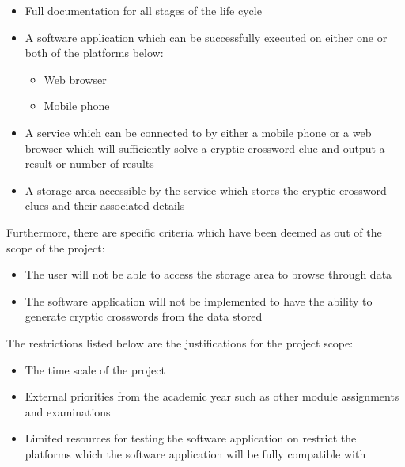 \begin{itemize}
	\item Full documentation for all stages of the life cycle
	\item A software application which can be successfully executed on either one
	      or both of the platforms below:
		\begin{itemize}
			\item Web browser
			\item Mobile phone
		\end{itemize}
	\item A service which can be connected to by either a mobile phone or a web 
	      browser which will sufficiently solve a cryptic crossword clue and 
	      output a result or number of results 
	\item A storage area accessible by the service which stores the cryptic 
	      crossword clues and their associated details
\end{itemize}

Furthermore, there are specific criteria which have been deemed as out of the 
scope of the project:

\begin{itemize}
	\item The user will not be able to access the storage area to browse through 
	      data
	\item The software application will not be implemented to have the ability to
	      generate cryptic crosswords from the data stored
\end{itemize}

The restrictions listed below are the justifications for the project scope:

\begin{itemize}
	\item The time scale of the project
	\item External priorities from the academic year such as other module 
	      assignments and examinations
	\item Limited resources for testing the software application on restrict the
	      platforms which the software application will be fully compatible with
\end{itemize}
